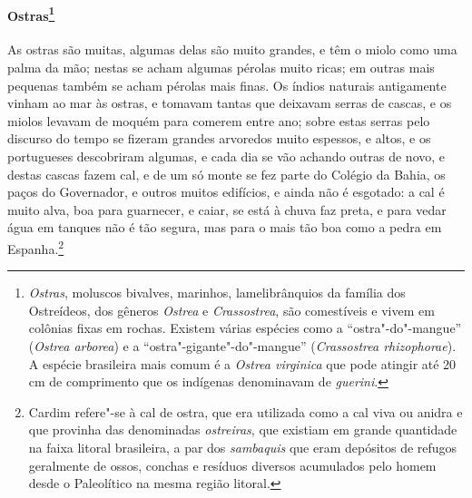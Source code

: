 \paragraph{Ostras\footnote{ \textit{Ostras}, moluscos bivalves,
marinhos, lamelibrânquios da família dos Ostreídeos, dos gêneros
\textit{Ostrea} e \textit{Crassostrea}, são comestíveis e vivem em
colônias fixas em rochas. Existem várias espécies como a
``ostra"-do"-mangue'' (\textit{Ostrea arborea}) e a ``ostra"-gigante"-do"-mangue'' 
(\textit{Crassostrea rhizophorae}). A espécie
brasileira mais comum é a \textit{Ostrea virginica} que pode atingir
até 20\,cm de comprimento que os indígenas denominavam de \textit{guerini}.} }
As ostras são muitas, algumas delas são muito grandes,
e têm o miolo como uma palma da mão; nestas se acham algumas pérolas
muito ricas; em outras mais pequenas também se acham pérolas mais
finas. Os índios naturais antigamente vinham ao mar às ostras, e
tomavam tantas que deixavam serras de cascas, e os miolos levavam de
moquém para comerem entre ano; sobre estas serras pelo discurso do
tempo se fizeram grandes arvoredos muito espessos, e altos, e os
portugueses descobriram algumas, e cada dia se vão achando outras de
novo, e destas cascas fazem cal, e de um só monte se fez parte do
Colégio da Bahia, os paços do Governador, e outros muitos edifícios, e
ainda não é esgotado: a cal é muito alva, boa para guarnecer, e caiar,
se está à chuva faz preta, e para vedar água em tanques não é tão
segura, mas para o mais tão boa como a pedra em Espanha.\footnote{ Cardim 
refere"-se à cal de ostra, que era utilizada como a cal viva ou
anidra e que provinha das denominadas \textit{ostreiras}, que existiam
em grande quantidade na faixa litoral brasileira, a par dos
\textit{sambaquis} que eram depósitos de refugos geralmente de ossos,
conchas e resíduos diversos acumulados pelo homem desde o Paleolítico
na mesma região litoral.} 

